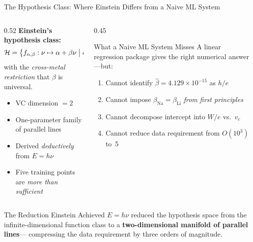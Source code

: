 \documentclass[aspectratio=169,12pt]{beamer}
\begin{document}
\begin{frame}[shrink=12]{The Hypothesis Class: Where Einstein Differs from a Naive ML System}

\begin{columns}[T]
\begin{column}{0.52\textwidth}
\textbf{Einstein's hypothesis class:}
\[
  \mathcal{H} = \bigl\{f_{\alpha,\beta}: \nu \mapsto \alpha + \beta\nu
  \bigm| \alpha\in\mathbb{R},\;\beta>0\bigr\}
\]
with the \emph{cross-metal restriction} that $\beta$ is universal.

\medskip
\begin{itemize}
  \item VC dimension $= 2$
  \item One-parameter family of parallel lines
  \item Derived \emph{deductively} from $E = h\nu$
  \item Five training points are \emph{more than sufficient}
\end{itemize}
\end{column}
\begin{column}{0.45\textwidth}
\begin{alertblock}{What a Naive ML System Misses}
A linear regression package gives the
right numerical answer---but:

\begin{enumerate}
  \item Cannot identify $\hat\beta = 4.129\times10^{-15}$
    as $h/e$
  \item Cannot impose $\beta_{\mathrm{Na}} = \beta_{\mathrm{Li}}$
    \emph{from first principles}
  \item Cannot decompose intercept into $W/e$ vs.\ $v_c$
  \item Cannot reduce data requirement from $O(10^3)$ to~5
\end{enumerate}
\end{alertblock}
\end{column}
\end{columns}

\bigskip
\begin{block}{The Reduction Einstein Achieved}
$E = h\nu$ reduced the hypothesis space from the infinite-dimensional
function class to a \textbf{two-dimensional manifold of parallel lines}---
compressing the data requirement by three orders of magnitude.
\end{block}

\end{frame}
\end{document}
